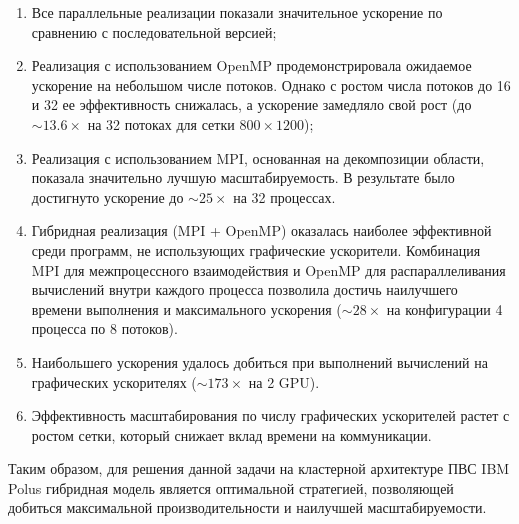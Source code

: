 \documentclass[12pt,a4paper]{article}
\begin{document}
    \begin{enumerate}
        \item Все параллельные реализации показали значительное ускорение по сравнению с последовательной версией;
        \item Реализация с использованием OpenMP продемонстрировала ожидаемое ускорение на небольшом числе потоков. Однако с ростом числа потоков до 16 и 32 ее эффективность снижалась, а ускорение замедляло свой рост (до \(\sim 13.6 \times\) на 32 потоках для сетки \(800 \times 1200\));
        \item Реализация с использованием MPI, основанная на декомпозиции области, показала значительно лучшую масштабируемость. В результате было достигнуто ускорение до \(\sim 25 \times\) на 32 процессах.
        \item Гибридная реализация (MPI + OpenMP) оказалась наиболее эффективной среди программ, не использующих графические ускорители. Комбинация MPI для межпроцессного взаимодействия и OpenMP для распараллеливания вычислений внутри каждого процесса позволила достичь наилучшего времени выполнения и максимального ускорения (\(\sim 28 \times\) на конфигурации 4 процесса по 8 потоков).
        \item Наибольшего ускорения удалось добиться при выполнений вычислений на графических ускорителях (\(\sim 173 \times\) на 2 GPU).
        \item Эффективность масштабирования по числу графических ускорителей растет с ростом сетки, который снижает вклад времени на коммуникации.
    \end{enumerate}

    Таким образом, для решения данной задачи на кластерной архитектуре ПВС IBM Polus гибридная модель является оптимальной стратегией, позволяющей добиться максимальной производительности и наилучшей масштабируемости.
\end{document}
